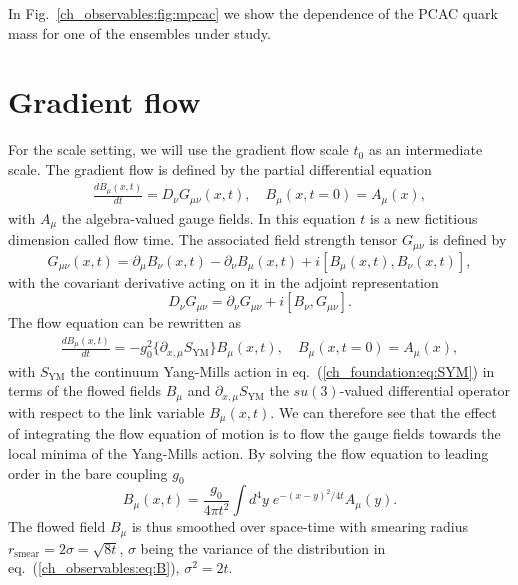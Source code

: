 In Fig.~\ref{ch_observables:fig:mpcac} we show the dependence of the PCAC quark mass for one of the ensembles under study.


\section{Gradient flow}
\label{ch_observables:sec:Flow}

For the scale setting, we will use the gradient flow scale $t_0$ as an intermediate scale. The gradient flow is defined by the partial differential equation~\citep{Luscher:2010we,1006.4518}
\begin{gather}
\label{ch_observables:eq:flow}
\frac{dB_{\mu}(x,t)}{dt}=D_{\nu}G_{\mu\nu}(x,t), \quad B_{\mu}(x,t=0)=A_{\mu}(x),
\end{gather}
with $A_{\mu}$ the algebra-valued gauge fields. In this equation $t$ is a new fictitious dimension called flow time. The associated field strength tensor $G_{\mu\nu}$ is defined by
\begin{equation}
G_{\mu\nu}(x,t)=\partial_{\mu}B_{\nu}(x,t)-\partial_{\nu}B_{\mu}(x,t)+i\left[B_{\mu}(x,t),B_{\nu}(x,t)\right],
\end{equation}
with the covariant derivative acting on it in the adjoint representation
\begin{equation}
D_{\nu}G_{\mu\nu}=\partial_{\nu}G_{\mu\nu}+i\left[B_{\nu},G_{\mu\nu}\right].
\end{equation}
The flow equation can be rewritten as
\begin{gather}
\frac{dB_{\mu}(x,t)}{dt}=-g_0^2\{\partial_{x,\mu}S_{\textrm{YM}}\}B_{\mu}(x,t), \quad B_{\mu}(x,t=0)=A_{\mu}(x),
\end{gather}
with $S_{\textrm{YM}}$ the continuum Yang-Mills action in eq.~(\ref{ch_foundation:eq:SYM}) in terms of the flowed fields $B_{\mu}$ and $\partial_{x,\mu}S_{\textrm{YM}}$ the $su(3)$-valued differential operator with respect to the link variable $B_{\mu}(x,t)$. We can therefore see that the effect of integrating the flow equation of motion is to flow the gauge fields towards the local minima of the Yang-Mills action. By solving the flow equation to leading order in the bare coupling $g_0$
\begin{equation}
\label{ch_observables:eq:B}
B_{\mu}(x,t)=\frac{g_0}{4\pi t^2}\int d^4y\;e^{-(x-y)^2/4t}A_{\mu}(y).
\end{equation}
The flowed field $B_{\mu}$ is thus smoothed over space-time with smearing radius $r_{\textrm{smear}}=2\sigma=\sqrt{8t}$, $\sigma$ being the variance of the distribution in eq.~(\ref{ch_observables:eq:B}), $\sigma^2=2t$.

